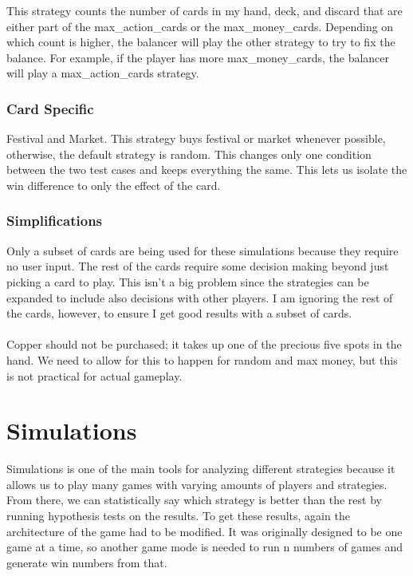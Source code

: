 \documentclass[11pt, oneside]{article}   	%
\begin{document}
This strategy counts the number of cards in my hand, deck, and discard that are either part of the max\_action\_cards or the max\_money\_cards. Depending on which count is higher, the balancer will play the other strategy to try to fix the balance. For example, if the player has more max\_money\_cards, the balancer will play a max\_action\_cards strategy. 

\subsubsection{Card Specific}

Festival and Market. This strategy buys festival or market whenever possible, otherwise, the default strategy is random. This changes only one condition between the two test cases and keeps everything the same. This lets us isolate the win difference to only the effect of the card. 

\subsubsection{Simplifications}

Only a subset of cards are being used for these simulations because they require no user input. The rest of the cards require some decision making beyond just picking a card to play. This isn't a big problem since the strategies can be expanded to include also decisions with other players. I am ignoring the rest of the cards, however, to ensure I get good results with a subset of cards. \\
\\
Copper should not be purchased; it takes up one of the precious five spots in the hand. We need to allow for this to happen for random and max money, but this is not practical for actual gameplay.

\section{Simulations}

Simulations is one of the main tools for analyzing different strategies because it allows us to play many games with varying amounts of players and strategies. From there, we can statistically say which strategy is better than the rest by running hypothesis tests on the results. To get these results, again the architecture of the game had to be modified. It was originally designed to be one game at a time, so another game mode is needed to run n numbers of games and generate win numbers from that. 
\end{document}
